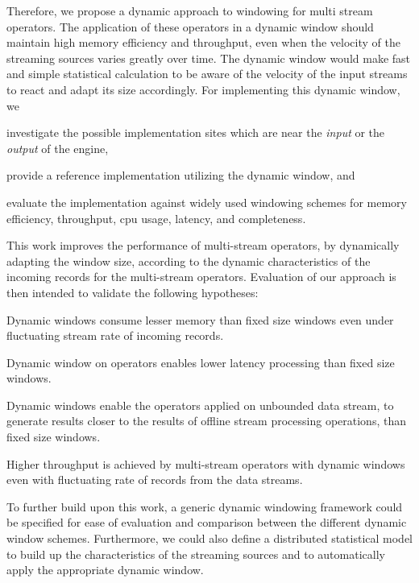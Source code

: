 Therefore, we propose a dynamic approach to windowing for multi stream operators.
The application of these operators in a dynamic window should maintain high memory efficiency and throughput,
even when the velocity of the streaming sources varies greatly over time. 
The dynamic window would make fast and simple statistical calculation to be 
aware of the velocity of the input streams to react and adapt its size accordingly. 
For implementing this dynamic window, we 
\renewcommand{\labelenumi}{(\roman{enumi})}
\begin{enumerate*}
    \item investigate the possible implementation sites which are near the \emph{input}
    or the \emph{output} of the engine, 
    \item provide a reference implementation utilizing the dynamic window, and 
    \item evaluate the implementation against widely used windowing schemes for 
    memory efficiency, throughput, cpu usage, latency, and completeness. 
\end{enumerate*}


This work improves the performance of multi-stream operators, 
by dynamically adapting the window size, according to the dynamic characteristics
of the incoming records for the multi-stream operators. Evaluation of 
our approach is then intended to validate the following hypotheses: 

\begin{hyp}
    Dynamic windows consume lesser memory than 
    fixed size windows even under fluctuating 
    stream rate of incoming records. 
\end{hyp}

\begin{hyp}
    Dynamic window on operators enables lower latency 
    processing than fixed size windows. 
\end{hyp}

\begin{hyp}
    Dynamic windows enable the operators applied on
    unbounded data stream, to generate 
    results closer to the results of offline stream processing operations, 
    than fixed size windows. 
\end{hyp}
\begin{hyp}
    Higher throughput is achieved by multi-stream operators 
    with dynamic windows even with fluctuating
    rate of records from the data streams.
\end{hyp}

To further build upon this work, a generic dynamic windowing 
framework could be specified for ease of evaluation and comparison between 
the different dynamic window schemes. Furthermore, we could also define a distributed 
statistical model to build up the characteristics of the streaming sources 
and to automatically apply the appropriate dynamic window. 


